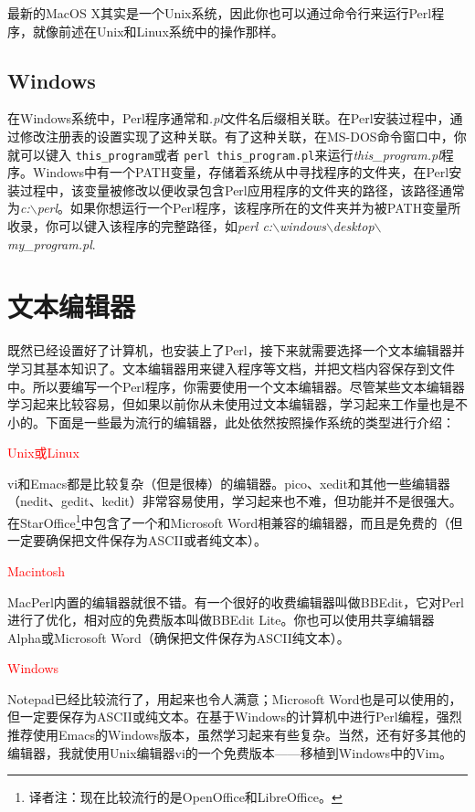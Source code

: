 最新的MacOS X其实是一个Unix系统，因此你也可以通过命令行来运行Perl程序，就像前述在Unix和Linux系统中的操作那样。

\subsection{Windows}
在Windows系统中，Perl程序通常和\textit{.pl}文件名后缀相关联。在Perl安装过程中，通过修改注册表的设置实现了这种关联。有了这种关联，在MS-DOS命令窗口中，你就可以键入 \verb|this_program|或者 \verb|perl this_program.pl|来运行\textit{this\_program.pl}程序。Windows中有一个PATH变量，存储着系统从中寻找程序的文件夹，在Perl安装过程中，该变量被修改以便收录包含Perl应用程序的文件夹的路径，该路径通常为\textit{c:$\backslash$perl}。如果你想运行一个Perl程序，该程序所在的文件夹并为被PATH变量所收录，你可以键入该程序的完整路径，如\textit{perl c:$\backslash$windows$\backslash$desktop$\backslash$my\_program.pl}.

\section{文本编辑器}
既然已经设置好了计算机，也安装上了Perl，接下来就需要选择一个文本编辑器并学习其基本知识了。文本编辑器用来键入程序等文档，并把文档内容保存到文件中。所以要编写一个Perl程序，你需要使用一个文本编辑器。尽管某些文本编辑器学习起来比较容易，但如果以前你从未使用过文本编辑器，学习起来工作量也是不小的。下面是一些最为流行的编辑器，此处依然按照操作系统的类型进行介绍：

\noindent
\textcolor{red}{Unix或Linux}
\begin{adjustwidth}{4em}{}
vi和Emacs都是比较复杂（但是很棒）的编辑器。pico、xedit和其他一些编辑器（nedit、gedit、kedit）非常容易使用，学习起来也不难，但功能并不是很强大。在StarOffice\footnote{译者注：现在比较流行的是OpenOffice和LibreOffice。}中包含了一个和Microsoft Word相兼容的编辑器，而且是免费的（但一定要确保把文件保存为ASCII或者纯文本）。
\end{adjustwidth}

\noindent
\textcolor{red}{Macintosh}
\begin{adjustwidth}{4em}{}
MacPerl内置的编辑器就很不错。有一个很好的收费编辑器叫做BBEdit，它对Perl进行了优化，相对应的免费版本叫做BBEdit Lite。你也可以使用共享编辑器Alpha或Microsoft Word（确保把文件保存为ASCII纯文本）。
\end{adjustwidth}

\noindent
\textcolor{red}{Windows}
\begin{adjustwidth}{4em}{}
Notepad已经比较流行了，用起来也令人满意；Microsoft Word也是可以使用的，但一定要保存为ASCII或纯文本。在基于Windows的计算机中进行Perl编程，强烈推荐使用Emacs的Windows版本，虽然学习起来有些复杂。当然，还有好多其他的编辑器，我就使用Unix编辑器vi的一个免费版本——移植到Windows中的Vim。
\end{adjustwidth}


